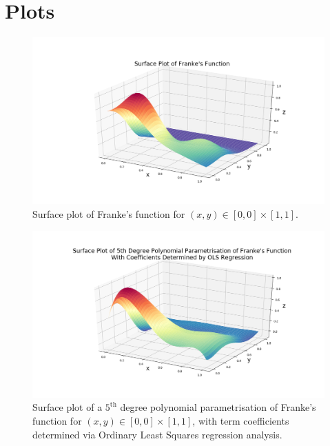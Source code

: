 \documentclass[reprint,english]{revtex4-1}
\begin{document}
\nocite{book}\nocite{project}


\clearpage
\appendix
\section{Plots}\label{app:plots}
\begin{figure}[h]
\centering
\includegraphics[scale=0.25,clip,trim={8cm 2cm 4cm 1cm}]{results/FrankeApprox2/exact_surface.png}
\caption{Surface plot of Franke's function for \((x,y)\in[0,0]\times[1,1]\).}\label{fig:franke_function}
\end{figure}

\begin{figure}[h]
\centering
\includegraphics[scale=0.25,clip,trim={4cm 2cm 4cm 1cm}]{results/FrankeApprox2/surface_deg5_OLS.png}
\caption{Surface plot of a \(5^{\text{th}}\) degree polynomial parametrisation of Franke's function for \((x,y)\in[0,0]\times[1,1]\), with term coefficients determined via Ordinary Least Squares regression analysis.}\label{fig:franke_parametrisation_ols}
\end{figure}
\end{document}
